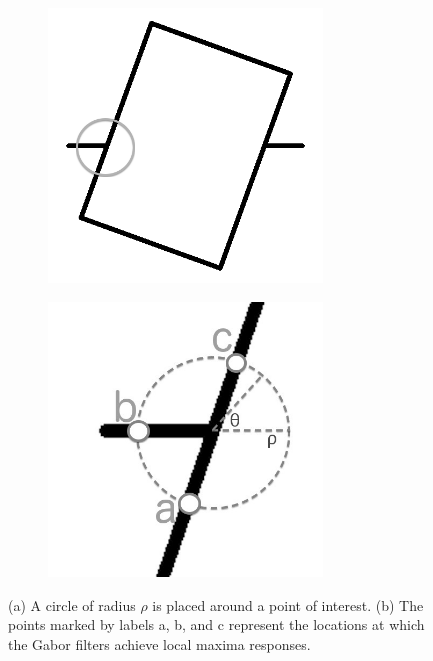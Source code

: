 \begin{figure}[h]
        \centering
        \begin{subfigure}[b]{0.3\textwidth}
                \centering
                \includegraphics[width=0.8\textwidth]{figures/Method/ModelPointOfInterest.png}
                \caption{}
                \label{fig:modelsymbol}
        \end{subfigure}
        \begin{subfigure}[b]{0.3\textwidth}
                \centering
                \includegraphics[width=0.8\textwidth]{figures/Method/actualConfiguration.jpg}
                \caption{}
                \label{fig:cosfireconf}
        \end{subfigure}
        \caption[Example configuration of a COSFIRE filter]{(a) A circle of radius $\rho$ is placed around a point of interest. (b) The points marked by labels a, b, and c represent the locations at which the Gabor filters achieve local maxima responses.}
        \label{fig:COSFIREConfigurationExample}
\end{figure}


